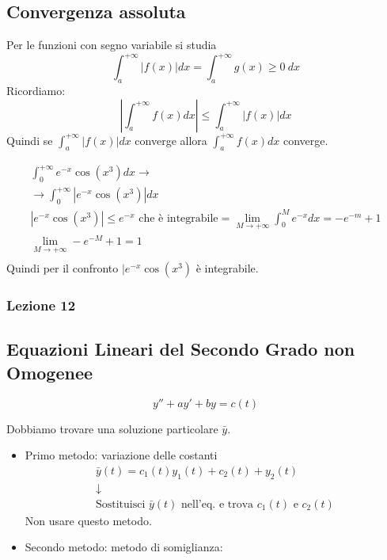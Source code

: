 \subsection{Convergenza assoluta}
Per le funzioni con segno variabile si studia
\begin{equation}
    \int_{a}^{+\infty} |f(x)| dx = \int_{a}^{+\infty} g(x)\geq 0\ dx
\end{equation}
Ricordiamo:
\begin{equation*}
    \left|\int_{a}^{+\infty} f(x) dx\right| \leq \int_{a}^{+\infty} |f(x)| dx
\end{equation*}
Quindi se $\int_{a}^{+\infty} |f(x)| dx$ converge allora $\int_{a}^{+\infty} f(x) dx$ converge.

\begin{esempio}
    \begin{gather*}
        \int_{0}^{+\infty} e^{-x}\cos(x^3) dx \to \\
        \to \int_{0}^{+\infty} |e^{-x}\cos(x^3)| dx \\
        |e^{-x}\cos(x^3)| \leq e^{-x} \text{ che è integrabile} = \lim_{M\to +\infty}\int_{0}^{M} e^{-x} dx=-e^{-m}+1 \\
        \lim_{M\to +\infty}-e^{-M}+1=1 \\
    \end{gather*}
    Quindi per il confronto $|e^{-x}\cos(x^3)$ è integrabile.
\end{esempio}

\subsubsection{Lezione 12}
\subsection{Equazioni Lineari del Secondo Grado non Omogenee}

\begin{equation}
    y'' + ay'+by = c(t)
\end{equation}

Dobbiamo trovare una soluzione particolare $\bar{y}$.
\begin{itemize}
    \item Primo metodo: variazione delle costanti
        \begin{gather*}
            \bar{y}(t) = c_1(t)y_1(t) + c_2(t) + y_2(t) \\
            \downarrow \\
            \text{Sostituisci $\bar{y}(t)$ nell'eq. e trova $c_1(t)$ e } c_2(t)
        \end{gather*}
        Non usare questo metodo.
    \item Secondo metodo: metodo di somiglianza:
\end{itemize}

